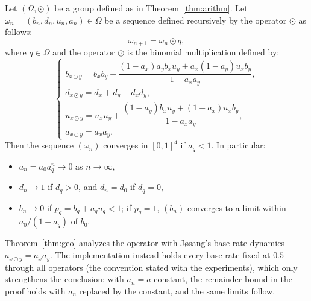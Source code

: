 \begin{theorem}\label{thm:geo}
Let $(\Omega, \odot)$ be a group defined as in Theorem~\ref{thm:arithm}.
Let $\omega_n = (b_n, d_n, u_n, a_n) \in \Omega$ be a sequence defined recursively by the operator $\odot$ as follows:
\[
\omega_{n+1} = \omega_n \odot q,
\]
where \(q\in \Omega\) and the operator $\odot$ is the binomial multiplication defined by:
\[
\begin{cases}
b_{x \odot y} = b_x b_y + \dfrac{(1 - a_x) a_y b_x u_y + a_x (1 - a_y) u_x b_y}{1 - a_x a_y}, \\
d_{x \odot y} = d_x + d_y - d_x d_y, \\
u_{x \odot y} = u_x u_y + \dfrac{(1 - a_y) b_x u_y + (1 - a_x) u_x b_y}{1 - a_x a_y}, \\
a_{x \odot y} = a_x a_y.
\end{cases}
\]
Then the sequence $(\omega_n)$ converges in $[0,1]^4$ if $a_q < 1$. In particular:
\begin{itemize}
    \item $a_n = a_0 a_q^n \to 0$ as $n \to \infty$,
    \item $d_n \to 1$ if $d_q > 0$, and $d_n = d_0$ if $d_q = 0$,
    \item $b_n \to 0$ if $p_q = b_q + a_q u_q < 1$; if $p_q = 1$, $(b_n)$ converges to a limit within $a_0/(1-a_q)$ of $b_0$.
\end{itemize}
\end{theorem}

Theorem~\ref{thm:geo} analyzes the operator with Jøsang's base-rate dynamics $a_{x \odot y} = a_x a_y$. The implementation instead holds every base rate fixed at $0.5$ through all operators (the convention stated with the experiments), which only strengthens the conclusion: with $a_n = a$ constant, the remainder bound in the proof holds with $a_n$ replaced by the constant, and the same limits follow.

